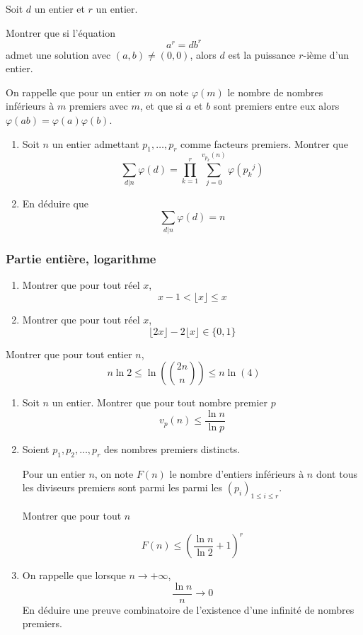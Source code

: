\begin{exo}
Soit $d$ un entier et $r$ un entier.

Montrer que si l'équation
$$a^r = d b^r$$
admet une solution avec $(a,b) \neq (0,0)$, alors $d$ est la puissance $r$-ième d'un entier.
\end{exo}

\begin{exo}
On rappelle que pour un entier $m$ on note $\varphi(m)$ le nombre de nombres inférieurs à $m$ premiers avec $m$, et que si $a$ et $b$ sont premiers entre eux alors $\varphi(ab) = \varphi(a) \varphi(b)$.
\begin{enumerate}
\item Soit $n$ un entier admettant $p_1,\ldots,p_r$ comme facteurs premiers. Montrer que
  $$\sum_{d | n} \varphi(d) = \prod_{k = 1}^r \sum_{j = 0}^{v_{p_k}(n)} \varphi({p_k}^j)$$
\item En déduire que
  $$\sum_{d | n} \varphi(d) = n$$
\end{enumerate}
\end{exo}

\subsubsection{Partie entière, logarithme}

\begin{exo}
\begin{enumerate}
\item Montrer que pour tout réel $x$,
  $$x-1 < \lfloor x \rfloor \le x$$
\item Montrer que pour tout réel $x$,
  $$\lfloor 2 x \rfloor  - 2 \lfloor x \rfloor \in \{0,1\}$$
\end{enumerate}
\end{exo}

\begin{exo}
Montrer que pour tout entier $n$,
$$n \ln 2 \le \ln \left(\binom{2n} n \right) \le n \ln(4)$$
\end{exo}


\begin{exo}
\begin{enumerate}
\item Soit $n$ un entier. Montrer que pour tout nombre premier $p$
$$v_p(n) \le \frac{\ln n}{\ln p}$$
\item Soient $p_1, p_2, \ldots, p_r$ des nombres premiers distincts.

Pour un entier $n$, on note $F(n)$ le nombre d'entiers inférieurs à $n$ dont tous les diviseurs premiers sont parmi les parmi les $(p_i)_{1 \le i \le r}$.

Montrer que pour tout $n$

$$F(n) \le \left(\frac{\ln n}{\ln 2} + 1 \right)^r$$
\item On rappelle que lorsque $n \to + \infty$,
$$\frac{\ln n} n \to 0$$
En déduire une preuve combinatoire de l'existence d'une infinité de nombres premiers.
\end{enumerate}
\end{exo}

